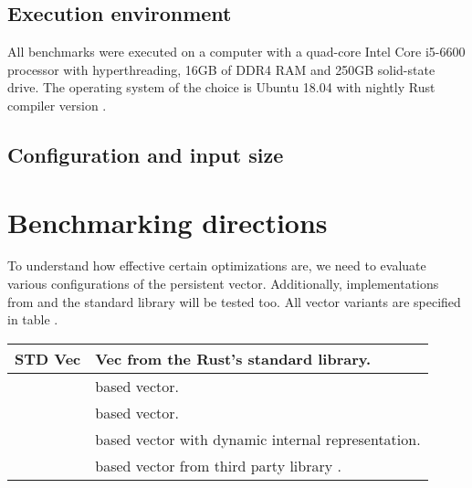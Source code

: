 \subsection{Execution environment}
All benchmarks were executed on a computer  with a quad-core Intel Core i5-6600 processor with hyperthreading, 16GB of DDR4 RAM and 250GB solid-state drive. The operating system of the choice is Ubuntu 18.04 with nightly Rust compiler version .

\subsection{Configuration and input size}

\section{Benchmarking directions}

To understand how effective certain optimizations are, we need to evaluate various configurations of the persistent vector. Additionally, implementations from \imrsvec{} and the standard library will be tested too. All vector variants are specified in table . 

\begin{center}
\begin{tabular} { |l| p{10cm} | }
    \hline
    STD Vec & Vec from the Rust's standard library. \\ \hline
    \rbvec{} & \rbtree{} based vector. \\ \hline
    \rrbvec{} & \rrbtree{} based vector. \\ \hline
    \pvec{} & \rrbtree{} based vector with dynamic internal representation. \\ \hline
    \imrsvec{} & \rrbtree{} based vector from third party library \imrsvec{}. \\
    \hline        
\end{tabular}
\end{center}

